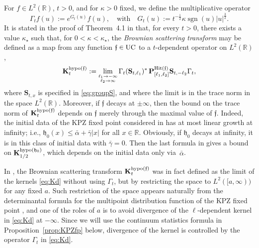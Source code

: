 \documentclass[oneside,final,11pt]{amsart}
\theoremstyle{definition}
\newcommand\hit{\uptext{Hit}}
\newcommand{\fh}{\mathfrak{h}}
\newcommand{\ff}{\mathfrak{f}}
\newcommand{\R}{\mathbb{R}}
\newcommand{\1}[1]{\mathbf{1}_{#1}}
\newcommand{\km}[1]{\marginnote{\tiny{\color{red}[KM: #1]}}}
\newcommand{\uptext}[1]{\text{\upshape{#1}}}
\DeclareMathOperator{\hypo}{\uptext{hypo}}
\DeclareMathOperator{\UC}{\uptext{UC}}
\DeclareMathOperator{\sgn}{sgn}
\newcommand{\fT}{\mathbf{S}}
\newcommand{\fP}{\mathbf{P}}
\newcommand{\fK}{\mathbf{K}}
\numberwithin{equation}{section}
\begin{document}
For $f \in L^2(\R)$, $t > 0$, and  for  $\kappa > 0$ fixed,  we define the multiplicative operator
\begin{equation}\label{eq:Gamma_L}
\Gamma_t f(u) := e^{G_t(u)}f(u), \quad \text{with}\quad G_t(u) := t^{-\frac{1}{2}} \kappa \sgn(u) |u|^{\frac{3}{2}}.
\end{equation}
It is stated in the proof of Theorem~4.1 in \cite{fixedpt} that, for every $t > 0$, there exists a value $\kappa_\star$ such that, for $0 < \kappa < \kappa_\star$, the \emph{Brownian scattering transform} may be defined as a map from any function $\ff \in \UC$ to a $t$-dependent operator on $L^2(\R)$,
\begin{equation}\label{eq:Kd}
\fK^{\hypo(\ff)}_{t} := \lim_{\small\substack{\ell_1\to -\infty\\\ell_2\to \infty}} \Gamma_t (\fT_{t,\ell_1})^*\, \fP_{[\ell_1,\ell_2]}^{\hit(\ff)}\fT_{t,-\ell_2} \Gamma_t,
\end{equation}
where $\fT_{t,x}$ is specified in \eqref{eq:groupS}, and where the limit is in the trace norm in the space $L^2(\R)$. Moreover, if $\ff$ decays at $\pm \infty$, then the bound on the trace norm of $\fK^{\hypo(\ff)}_{t}$ depends on $\ff$ merely through the maximal value of $\ff$. Indeed, the initial data of the KPZ fixed point considered in \cite{fixedpt} has at most linear growth at infinity; i.e., $\fh_0(x) \leq \bar \alpha + \bar \gamma |x|$ for all $x \in \R$. Obviously, if $\fh_0$ decays at infinity, it is in this class of initial data with $\bar \gamma = 0$. Then the last formula in \cite[Appendix~A.1]{fixedpt} gives a bound on $\fK^{\hypo(\fh_0)}_{1/2}$, which depends on the initial data only via~$\bar \alpha$. %

In \cite[Section~4.1]{fixedpt}, the Brownian scattering transform $\fK^{\hypo(\ff)}_{t}$ was in fact defined as the limit of the kernels \eqref{eq:Kd} without using $\Gamma_t$, but by restricting the space to $L^2([a,\infty))$ for any fixed $a$. Such restriction of the space appears naturally from the determinantal formula for the multipoint distribution function of the KPZ fixed point \cite[Eq.~4.7]{fixedpt}, and one of the roles of $a$ is to avoid divergence of the $\ell$-dependent kernel in \eqref{eq:Kd} at $-\infty$. Since we will use the continuum statistics formula in Proposition~\ref{prop:KPZfp} below, divergence of the kernel is controlled by the operator $\Gamma_t$ in \eqref{eq:Kd}.
\end{document}
